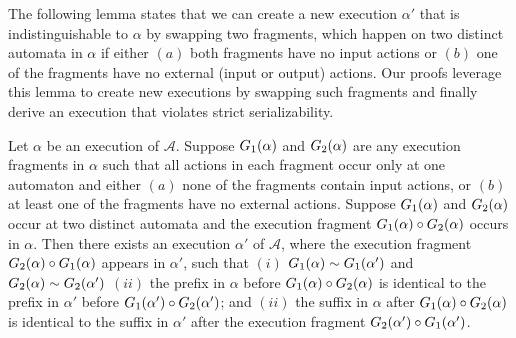 The following lemma states that we can create a new execution $\alpha'$ that is indistinguishable to $\alpha$ by swapping two fragments, which happen on two distinct automata in $\alpha$ if either $(a)$ both fragments have no input actions or 
$(b)$ one of the fragments have no external (input or output) actions. Our proofs leverage this lemma to create new executions by swapping such fragments and finally derive an execution that violates strict serializability.  
  \begin{lemma} \label{lem:exec3_commute} 
  Let $\alpha$ be an execution of $\mathcal{A}$. Suppose $\frage{G_1}{\alpha}{}$ and $\frage{G_2}{\alpha}{}$ are any  execution fragments in $\alpha$ such that
  all actions in each fragment occur only at one automaton and  either $(a)$ none of the fragments contain input actions, or $(b)$ 
  at least one of the fragments have no external actions. Suppose $\frage{G_1}{\alpha}{}$ 
  and $\frage{G_2}{\alpha}{}$  occur at two distinct automata and the execution
  fragment $\frage{G_1}{\alpha}{}\circ \frage{G_2}{\alpha}{}$ occurs in $\alpha$.
  Then there exists an execution $\alpha'$ of $\mathcal{A}$, where  the execution fragment  $\frage{G_2}{\alpha}{}\circ \frage{G_1}{\alpha}{}$ appears in $\alpha'$, such that 
  $(i)$  $\frage{G_1}{\alpha}{} \sim \frage{G_1}{\alpha'}{}$ and  $\frage{G_2}{\alpha}{} \sim \frage{G_2}{\alpha'}{}$
  $(ii)$ 
the prefix  in $\alpha$  before  $\frage{G_1}{\alpha}{} \circ \frage{G_2}{\alpha}{}$
 is identical to the prefix  in $\alpha'$ before  $\frage{G_1}{\alpha'}{} \circ \frage{G_2}{\alpha'}{}$; and $(ii)$ 
the suffix in $\alpha$  after   
 $\frage{G_1}{\alpha}{} \circ \frage{G_2}{\alpha}{}$
is identical to the suffix in $\alpha'$ after the execution fragment 
 $\frage{G_2}{\alpha'}{} \circ \frage{G_1}{\alpha'}{}$. 
  \end{lemma}


